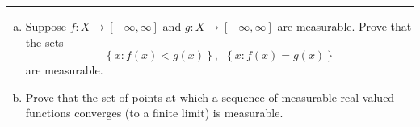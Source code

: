 \documentclass[letterpaper, 12pt]{article}
\begin{document}
\noindent\rule{7in}{2.8pt}
\begin{comment}
\begin{problem}{1.4}
Let \(\left\{ a_n \right\}\) and \(\left\{ b_n \right\}\) be sequences in \([-\infty, \infty]\), and prove the following assertions:
\begin{enumerate}[(a)]
  \item \(\limsup_{n\to \infty}(-a_n)=-\liminf_{n\to \infty}a_n\). 
  \item \(\limsup_{n\to \infty}(a_n+b_n)\leq \limsup_{n\to \infty}a_n+\limsup_{n\to\infty}b_n\) provided none of the sums is of the form \(\infty-\infty\).
  \item If \(a_n\leq b_n\) for all \(n\), then 
  \[\liminf_{n\to \infty} a_n\leq \liminf_{n\to \infty}b_n\]
\end{enumerate}
Show by an example that strict inequality can hold in \((b)\).
\end{problem}
\begin{solution}

\end{solution}

\noindent\rule{7in}{2.8pt}
\end{comment}
\begin{problem}{1.5}
\begin{enumerate}[(a)]
  \item Suppose \(f:X\rightarrow [-\infty,\infty]\) and \(g:X\rightarrow [-\infty,\infty]\) are measurable. Prove that the sets 
  \[\left\{ x:f(x)<g(x) \right\},\ \ \left\{ x:f(x)=g(x) \right\}\]
  are measurable.
  \item Prove that the set of points at which a sequence of measurable real-valued functions converges (to a finite limit) is measurable.
\end{enumerate}
\end{problem}
\end{document}
